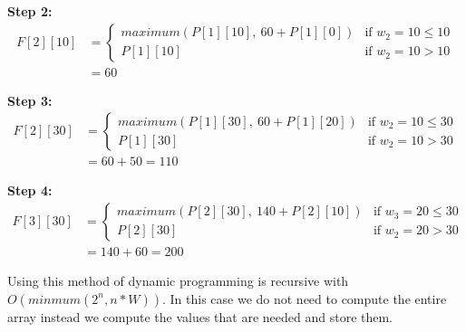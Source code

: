 \textbf{Step 2: }
\begin{align*}
	F[2][10] &= 
	\begin{cases}
		maximum(P[1][10], \ 60 + P[1][0]) & \mbox{if }  w_2 = 10 \leq 10 \\
		P[1][10] & \mbox{if } w_2 = 10 > 10
	\end{cases} \\
	&= 60
\end{align*}

\textbf{Step 3: }
\begin{align*}
	F[2][30] &= 
	\begin{cases}
		maximum(P[1][30], \ 60 + P[1][20]) & \mbox{if }  w_2 = 10 \leq 30 \\
		P[1][30] & \mbox{if } w_2 = 10 > 30
	\end{cases} \\
	&= 60 + 50 = 110
\end{align*}

\textbf{Step 4: }
\begin{align*}
	F[3][30] &= 
	\begin{cases}
		maximum(P[2][30], \ 140 + P[2][10]) & \mbox{if }  w_3 = 20 \leq 30 \\
		P[2][30] & \mbox{if } w_2 = 20 > 30
	\end{cases} \\
	&= 140 + 60 = 200
\end{align*}

\forceindent Using this method of dynamic programming is recursive with $O(minmum(2^n, n*W))$. In this case we do not need to compute the entire array instead we compute the values that are needed and store them. 

\newpage


 
\textcolor{white}{\cite{martin_01_2020}\cite{neopolitan_foundations_nodate}\cite{noauthor_knapsack_nodate}\cite{noauthor_knapsack_nodate-2}}

